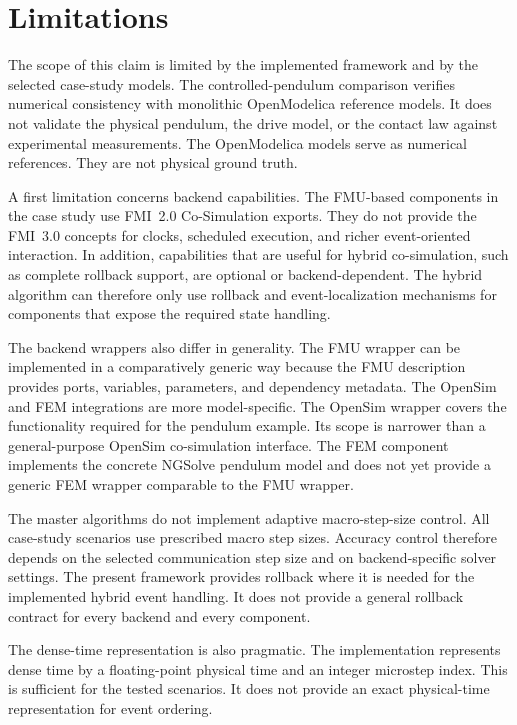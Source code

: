 \section{Limitations}
\label{sec:discussion_limitations}

The scope of this claim is limited by the implemented framework and by the selected case-study models.
The controlled-pendulum comparison verifies numerical consistency with monolithic OpenModelica reference models.
It does not validate the physical pendulum, the drive model, or the contact law against experimental measurements.
The OpenModelica models serve as numerical references.
They are not physical ground truth.

A first limitation concerns backend capabilities.
The FMU-based components in the case study use FMI~2.0 Co-Simulation exports.
They do not provide the FMI~3.0 concepts for clocks, scheduled execution, and richer event-oriented interaction.
In addition, capabilities that are useful for hybrid co-simulation, such as complete rollback support, are optional or backend-dependent.
The hybrid algorithm can therefore only use rollback and event-localization mechanisms for components that expose the required state handling.

The backend wrappers also differ in generality.
The FMU wrapper can be implemented in a comparatively generic way because the FMU description provides ports, variables, parameters, and dependency metadata.
The OpenSim and FEM integrations are more model-specific.
The OpenSim wrapper covers the functionality required for the pendulum example.
Its scope is narrower than a general-purpose OpenSim co-simulation interface.
The FEM component implements the concrete NGSolve pendulum model and does not yet provide a generic FEM wrapper comparable to the FMU wrapper.

The master algorithms do not implement adaptive macro-step-size control.
All case-study scenarios use prescribed macro step sizes.
Accuracy control therefore depends on the selected communication step size and on backend-specific solver settings.
The present framework provides rollback where it is needed for the implemented hybrid event handling.
It does not provide a general rollback contract for every backend and every component.

The dense-time representation is also pragmatic.
The implementation represents dense time by a floating-point physical time and an integer microstep index.
This is sufficient for the tested scenarios.
It does not provide an exact physical-time representation for event ordering.

